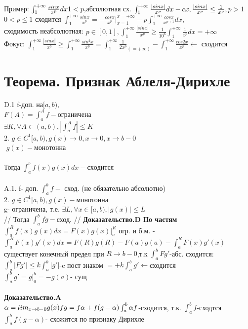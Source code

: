 \documentclass[12pt, a4paper]{article}
\begin{document}
Пример: $ \int_1^{+\infty} \frac{sinx}{x^p} dx\\
 1<p, $абсолютная сх. $ \int_1^{+\infty} \frac{|sinx|}{x^p}dx - cx, \frac{|sinx|}{x^p} \leq \frac{1}{x^p}, p>1\\ $
 \\
 $ 0<p\leq 1 $ сходится $ \int_1^{+\infty} \frac{sinx}{x^p}= -\frac{cosx}{x^p}|_{x=1}^{x=+\infty} -p \int_1^{+\infty} \frac{cosx}{x^{p+1}}dx $, \\
 сходимость неабсолютная: $ p \in [0,1], \int_1^{+\infty}\frac{|sinx|}{x^p}\geq \frac{1}{10^6}\int_1^{+\infty} \frac{1}{x^p}dx =+\infty $\\
 Фокус: $ \int_1^{+\infty} \frac{|sinx|}{x^p}\geq \int_1^{+\infty}\frac{sin^2x}{x^p}=\int_1^{+\infty}\frac{1}{2x^p}_{(=+\infty)}-\int_1^{+\infty}\frac{cos2x}{x^p} \leftarrow$ сходится\\
 \section{Теорема. Признак Аблеля-Дирихле}
 D.1 f-доп. на$ [a,b),$ \\
  $\boxed{F(A) = \int_a^A f-ограничена }$\\
  $ \exists K, \forall A \in (a,b), |\int_a^A f| \leq K $\\
  2. $ g \in C^1[a,b), g(x) \rightarrow 0, x\rightarrow 0, x\rightarrow b - 0$\\$  $
$ g(x)- $монотонна\\
\\
Тогда $\boxed{ \int_a^bf(x)g(x)dx-  сходится}$\\
\\
A.1. f- доп.  $ \int_a^b f - $ сход. (не обязательно абсолютно)\\
 2. $ g \in C^1 [a,b), g(x)- $монотонна\\
 g- ограничена, т.е. $ \exists L, \forall x \in  [a,b), |g(x)|\leq L $\\
//
 Тогда $\int_a^b fg- $сход.
//     
\textbf{Доказательство.D По частям}\\
$ \int_a^R f(x)g(x)dx =F(x)g(x)|_a^R$ огр. и б.м. -$ \int_a^R F(x)g'(x)dx =F(R)g(R)-F(a)g(a) -\int_a^R F(x)g'(x) $ существует конечный предел при $ R \rightarrow b - 0 $,т.к $ \int_a^b Fg'$-абс. сходится:\\  $ \int_a^b |Fg'| \leq k \int_a^b|g'| $-c пост знаком $ = \underline{+} k \int_a^b g' \leftarrow$сходится \\ 
$ \int_a^b g' = g|_a^b= -g(a) $- сущ \\
\\
\textbf{Доказательство.A}\\
$ \alpha = lim_{x \rightarrow b - 0} g(x)\\
fg=f \alpha + f(g-\alpha)\\
\int_a^b \alpha f  $-сходится, т.к. $\int_a^b f  $-сходтся\\
$ \int_a^b  f(g - \alpha) $-  схожится по признаку Дирихле\\
\end{document}
